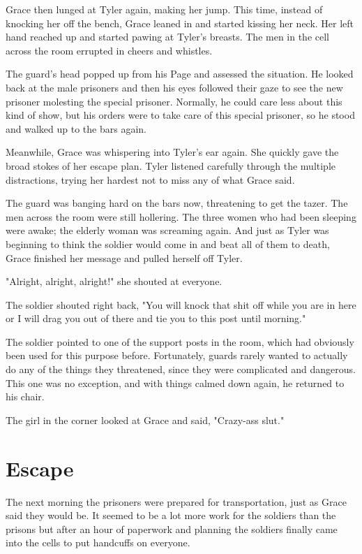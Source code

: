 \documentclass[courier]{sffms}
\begin{document}
Grace then lunged at Tyler again, making her jump. This time,
instead of knocking her off the bench, Grace leaned in and started
kissing her neck. Her left hand reached up and started pawing
at Tyler's breasts. The men in the cell across the room errupted
in cheers and whistles.

The guard's head popped up from his
Page and assessed the situation. He looked back at
the male prisoners and then his eyes followed their gaze
to see the new prisoner molesting the special prisoner.
Normally, he could care less about this kind of show,
but his orders were to take care of this special prisoner,
so he stood and walked up to the bars again.

Meanwhile, Grace was whispering into Tyler's ear again.
She quickly gave the broad stokes of her escape plan.
Tyler listened carefully through the multiple distractions,
trying her hardest not to miss any of what Grace said.

The guard was banging hard on the bars now, threatening
to get the tazer. The men across the room were still
hollering. The three women who had been sleeping were
awake; the elderly woman was screaming again. And just
as Tyler was beginning to think the soldier would come
in and beat all of them to death, Grace finished her
message and pulled herself off Tyler.

"Alright, alright, alright!" she shouted at everyone.

The soldier shouted right back, "You will knock that
shit off while you are in here or I will drag you out
of there and tie you to this post until morning."

The soldier pointed to one of the support posts in the room,
which had obviously been used for this purpose before.
Fortunately, guards rarely wanted to actually do any of the
things they threatened, since they were complicated and
dangerous. This one was no exception, and with things
calmed down again, he returned to his chair.

The girl in the corner looked at Grace and said, "Crazy-ass
slut."

\chapter{Escape}
The next morning the prisoners were prepared for transportation,
just as Grace said they would be. It seemed to be a lot more
work for the soldiers than the prisons but after an hour of
paperwork and planning the soldiers finally came into the cells
to put handcuffs on everyone.
\end{document}
